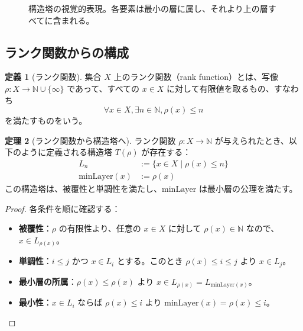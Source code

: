\documentclass[a4paper,11pt]{ltjsarticle}
\theoremstyle{definition}
\newtheorem{theorem}{定理}[section]
\newtheorem{definition}[theorem]{定義}
\newcommand{\N}{\mathbb{N}}
\begin{document}
\begin{figure}[htbp]
\centering
{}
\caption{構造塔の視覚的表現。各要素は最小の層に属し、それより上の層すべてに含まれる。}
\end{figure}

\subsection{ランク関数からの構成}

\begin{definition}[ランク関数]
集合 $X$ 上のランク関数（rank function）とは、写像 $\rho : X \to \N \cup \{\infty\}$ であって、すべての $x \in X$ に対して有限値を取るもの、すなわち
\[
\forall x \in X, \exists n \in \N, \rho(x) \leq n
\]
を満たすものをいう。
\end{definition}

\begin{theorem}[ランク関数から構造塔へ]\label{thm:rank-to-tower}
ランク関数 $\rho : X \to \N$ が与えられたとき、以下のように定義される構造塔 $T(\rho)$ が存在する：
\begin{align*}
L_n &:= \{x \in X \mid \rho(x) \leq n\} \\
\mathrm{minLayer}(x) &:= \rho(x)
\end{align*}
この構造塔は、被覆性と単調性を満たし、$\mathrm{minLayer}$ は最小層の公理を満たす。
\end{theorem}

\begin{proof}
各条件を順に確認する：
\begin{itemize}
\item \textbf{被覆性}：$\rho$ の有限性より、任意の $x \in X$ に対して $\rho(x) \in \N$ なので、$x \in L_{\rho(x)}$。
\item \textbf{単調性}：$i \leq j$ かつ $x \in L_i$ とする。このとき $\rho(x) \leq i \leq j$ より $x \in L_j$。
\item \textbf{最小層の所属}：$\rho(x) \leq \rho(x)$ より $x \in L_{\rho(x)} = L_{\mathrm{minLayer}(x)}$。
\item \textbf{最小性}：$x \in L_i$ ならば $\rho(x) \leq i$ より $\mathrm{minLayer}(x) = \rho(x) \leq i$。\qedhere
\end{itemize}
\end{proof}
\end{document}
